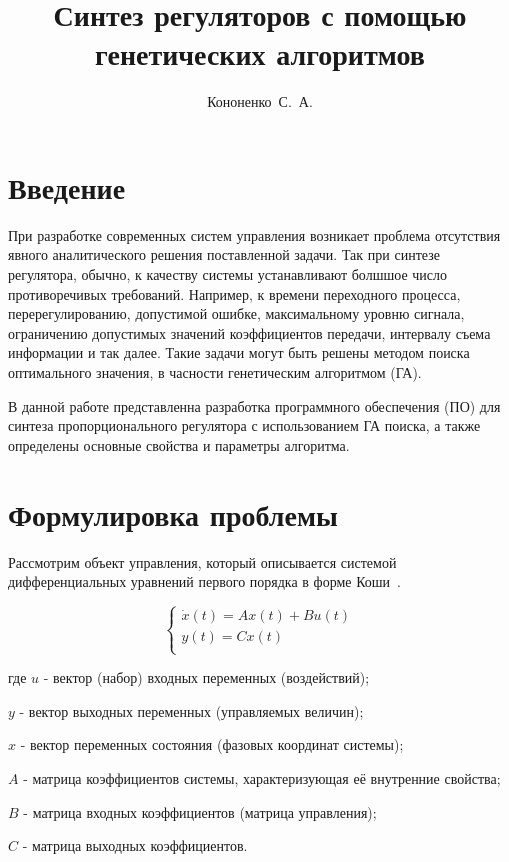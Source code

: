 \documentclass[russian,utf8,emptystyle,12pt]{eskdtext}
\title{Синтез регуляторов с помощью генетических алгоритмов}
\author{Кононенко~С.~А.}
\begin{document}
    \maketitle
    
    \tableofcontents
    
    \section*{Введение}
    
		При разработке современных систем управления возникает проблема отсутствия явного аналитического решения поставленной задачи. Так при синтезе регулятора, обычно, к качеству системы устанавливают болшшое число противоречивых требований. Например, к времени переходного процесса, перерегулированию, допустимой ошибке, максимальному уровню сигнала, ограничению допустимых значений коэффициентов передачи, интервалу съема информации и так далее. Такие задачи могут быть решены методом поиска оптимального значения, в часности генетическим алгоритмом (ГА).
		
		В данной работе представленна разработка программного обеспечения (ПО) для синтеза пропорционального регулятора с использованием ГА поиска, а также определены основные свойства и параметры алгоритма.
		
		
	   
    \section{Формулировка проблемы}
    
        Рассмотрим объект управления, который описывается системой дифференциальных уравнений первого порядка в форме Коши~\cite{bib:miroshnik}.
        
        \begin{equation}
            \begin{cases}
                \dot x(t) = A x(t) + B u(t) \\
                     y(t) = C x(t) \\
            \end{cases}
            \label{eq:state-space}
        \end{equation}
        
	    \begin{ESKDexplanation}
	        \item[где ] $u$ - вектор (набор) входных переменных
	                    (воздействий);        
	        \item $y$ - вектор выходных переменных (управляемых величин);
	        \item $x$ - вектор переменных состояния (фазовых координат системы);
	        \item $A$ - матрица коэффициентов системы, характеризующая её
	                    внутренние свойства;
	        \item $B$ - матрица входных коэффициентов (матрица управления);
	        \item $C$ - матрица выходных коэффициентов.
        \end{ESKDexplanation}
        
\end{document}
